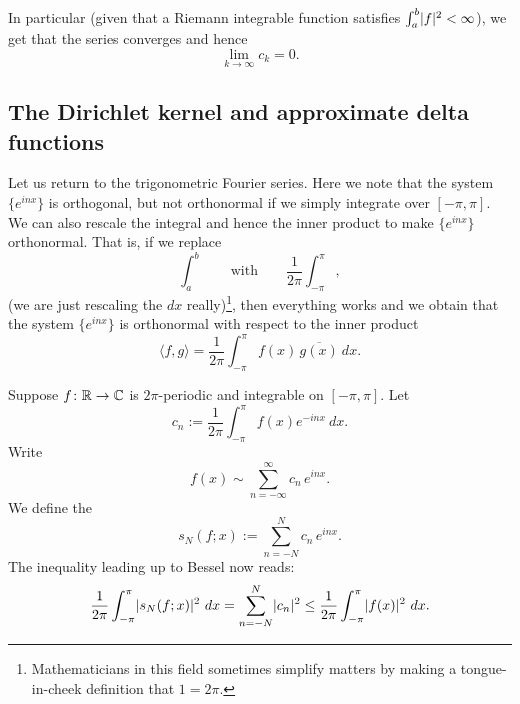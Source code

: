 In particular (given that a Riemann integrable function satisfies
$\int_a^b \lvert {f} \rvert^2 < \infty$), we get that the series
converges and hence
\begin{equation*}
\lim_{k \to \infty} c_k = 0 .
\end{equation*}

\subsection{The Dirichlet kernel and approximate delta functions}

Let us return to the trigonometric Fourier series.  Here we note that the
system $\{ e^{inx} \}$ is orthogonal, but not orthonormal if we simply
integrate over $[-\pi,\pi]$.  We can also rescale the integral
and hence the inner product to make 
$\{ e^{inx} \}$ orthonormal.  That is, if we replace
\begin{equation*}
\int_a^b \qquad \text{with} \qquad
\frac{1}{2\pi} \int_{-\pi}^\pi,
\end{equation*}
(we are just rescaling the $dx$ really)\footnote{%
Mathematicians in this field sometimes simplify matters by
making a tongue-in-cheek definition that $1=2\pi$.},
then everything works and we obtain that the system $\{ e^{inx} \}$
is orthonormal with respect to the inner product
\begin{equation*}
\langle f , g \rangle =
\frac{1}{2\pi} \int_{-\pi}^\pi f(x) \, \overline{g(x)} ~ dx .
\end{equation*}

Suppose $f \colon {\mathbb{R}} \to {\mathbb{C}}$ is $2\pi$-periodic and integrable
on $[-\pi,\pi]$.
Let
\begin{equation*}
c_n := 
\frac{1}{2\pi} \int_{-\pi}^\pi
f(x) e^{-inx} ~ dx .
\end{equation*}
Write
\begin{equation*}
f(x) \sim
\sum_{n=-\infty}^\infty c_n \,e^{inx} .
\end{equation*}
We define the \emph{}
\begin{equation*}
s_N(f;x) := 
\sum_{n=-N}^N c_n \,e^{inx} .
\end{equation*}
The inequality leading up to Bessel now reads:
\begin{equation*}
\frac{1}{2\pi} \int_{-\pi}^\pi
\lvert {s_N(f;x)} \rvert^2 ~ dx =
\sum_{n=-N}^N \lvert {c_n} \rvert^2
\leq
\frac{1}{2\pi} \int_{-\pi}^\pi
\lvert {f(x)} \rvert^2
~ dx .
\end{equation*}

